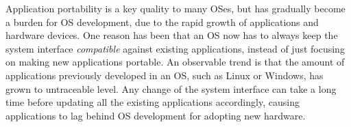 Application portability is a key quality to many OSes, but has gradually
become a burden for OS development,
due to the rapid growth of applications and hardware devices.
One reason has been that an OS now has to always keep the system interface {\em compatible} against existing applications,
instead of just focusing on making new applications portable.
An observable trend is that the amount of applications previously developed in an OS, such as Linux or Windows, has grown to 
untraceable level.
Any change of the system interface can take a long time before updating all the existing applications accordingly, causing applications to lag behind OS development for adopting new hardware.
